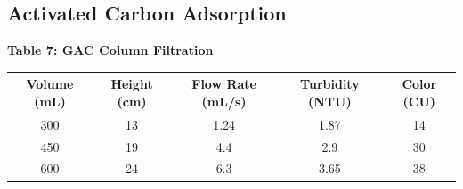 \subsection{Activated Carbon Adsorption}
\begin{center}
    


\vspace{3mm}
{\large{\bf Table 7: GAC Column Filtration\\}}
\vspace{3 mm}
\begin{tabular}{|c c c c c|}
    \hline
    \textbf{Volume (mL)} & \textbf{Height (cm)} & \textbf{Flow Rate (mL/s)} & \textbf{Turbidity (NTU)} & \textbf{Color (CU)} \\\hline
    300 & 13 & 1.24 & 1.87 & 14 \\
    450 & 19 & 4.4 & 2.9 & 30 \\
    600 & 24 & 6.3 & 3.65 & 38 \\\hline
\end{tabular}
\vspace{6mm}


\pgfplotsset{width=8cm}


\end{center}
